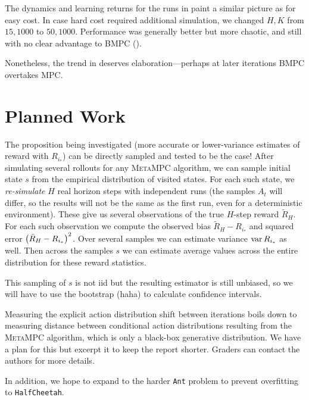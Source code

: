 \documentclass{article}
\begin{document}
The dynamics and learning returns for the runs in  paint a similar picture as for easy cost. In case hard cost required additional simulation, we changed $H,K$ from $15,1000$ to $50,1000$. Performance was generally better but more chaotic, and still with no clear advantage to BMPC ().


Nonetheless, the trend in  deserves elaboration---perhaps at later iterations BMPC overtakes MPC.

\section{Planned Work}

The proposition being investigated (more accurate or lower-variance estimates of reward with $R_{i_*}$) can be directly sampled and tested to be the case! After simulating several rollouts for any \textsc{MetaMPC} algorithm, we can sample initial state $s$ from the empirical distribution of visited states. For each such state, we \textit{re-simulate} $H$ real horizon steps with independent runs (the samples $A_t$ will differ, so the results will not be the same as the first run, even for a deterministic environment). These give us several observations of the true $H$-step reward $\tilde{R}_H$. For each such observation we compute the observed bias $\tilde{R}_H-R_{i_*}$ and squared error $\left({\tilde{R}_H-R_{i_*}}\right)^2$. Over several samples we can estimate variance $\operatorname{var} R_{i_*}$ as well. Then across the samples $s$ we can estimate average values across the entire distribution for these reward statistics.

This sampling of $s$ is not iid but the resulting estimator is still unbiased, so we will have to use the bootstrap (haha) to calculate confidence intervals.

Measuring the explicit action distribution shift between iterations boils down to measuring distance between conditional action distributions resulting from the \textsc{MetaMPC} algorithm, which is only a black-box generative distribution. We have a plan for this but excerpt it to keep the report shorter. Graders can contact the authors for more details.

In addition, we hope to expand to the harder \texttt{Ant} problem to prevent overfitting to \texttt{HalfCheetah}.
\end{document}
